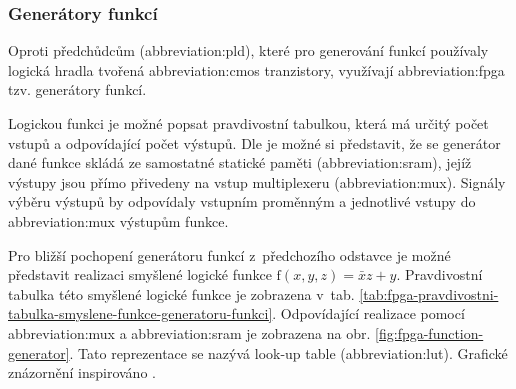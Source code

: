 \documentclass[a4paper, twoside, 11pt]{article}
\begin{document}
		\subsubsection{Generátory funkcí}\label{subsubsec:generatory-funkci}
		Oproti předchůdcům (\gls{abbreviation:pld}), které pro generování funkcí používaly logická hradla tvořená \gls{abbreviation:cmos} tranzistory, využívají \gls{abbreviation:fpga} tzv. generátory funkcí.\par
		Logickou funkci je možné popsat pravdivostní tabulkou, která má určitý počet vstupů a odpovídající počet výstupů. Dle \cite{Sass2010} je možné si představit, že se generátor dané funkce skládá ze samostatné statické paměti (\gls{abbreviation:sram}), jejíž výstupy jsou přímo přivedeny na vstup multiplexeru (\gls{abbreviation:mux}). Signály výběru výstupů by odpovídaly vstupním proměnným a jednotlivé vstupy do \gls{abbreviation:mux} výstupům funkce.\par
		Pro bližší pochopení generátoru funkcí z~předchozího odstavce je možné představit realizaci smyšlené logické funkce $\text{f} (x, y, z) = \bar{x}z + y$. Pravdivostní tabulka této smyšlené logické funkce je zobrazena v~tab. \ref{tab:fpga-pravdivostni-tabulka-smyslene-funkce-generatoru-funkci}. Odpovídající realizace pomocí \gls{abbreviation:mux} a \gls{abbreviation:sram} je zobrazena na obr. \ref{fig:fpga-function-generator}. Tato reprezentace se nazývá look-up table (\gls{abbreviation:lut}). Grafické znázornění inspirováno \cite{Sass2010}.
		
\end{document}
